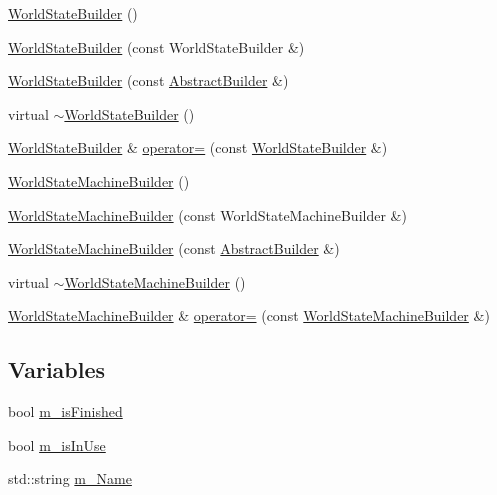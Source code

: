 \begin{DoxyCompactItemize}
\item 
\hyperlink{namespacejli_a88da1051609daf8c3b51a17aaaba6b20}{World\+State\+Builder} ()
\item 
\hyperlink{namespacejli_aafac5abdb6771d571a01cd2b15cf3c40}{World\+State\+Builder} (const World\+State\+Builder \&)
\item 
\hyperlink{namespacejli_a2fc992455822a29ef638f909b9c6d488}{World\+State\+Builder} (const \hyperlink{classjli_1_1_abstract_builder}{Abstract\+Builder} \&)
\item 
virtual \hyperlink{namespacejli_a1fd032a77e855549e124959bff91c7a1}{$\sim$\+World\+State\+Builder} ()
\item 
\hyperlink{namespacejli_a88da1051609daf8c3b51a17aaaba6b20}{World\+State\+Builder} \& \hyperlink{namespacejli_a3c6e238035eb39ac53eba6c12917498a}{operator=} (const \hyperlink{namespacejli_a88da1051609daf8c3b51a17aaaba6b20}{World\+State\+Builder} \&)
\item 
\hyperlink{namespacejli_a49d67a18946a3915d0a562ddf86b89c6}{World\+State\+Machine\+Builder} ()
\item 
\hyperlink{namespacejli_a6a39446edb896c185f35783291ea1149}{World\+State\+Machine\+Builder} (const World\+State\+Machine\+Builder \&)
\item 
\hyperlink{namespacejli_af7dfdedea09f0f90868c8bb003c929f0}{World\+State\+Machine\+Builder} (const \hyperlink{classjli_1_1_abstract_builder}{Abstract\+Builder} \&)
\item 
virtual \hyperlink{namespacejli_a9771b042fe85f154082f80b466292989}{$\sim$\+World\+State\+Machine\+Builder} ()
\item 
\hyperlink{namespacejli_a49d67a18946a3915d0a562ddf86b89c6}{World\+State\+Machine\+Builder} \& \hyperlink{namespacejli_ae3e2c8d1c5fbc155d7193d73db125543}{operator=} (const \hyperlink{namespacejli_a49d67a18946a3915d0a562ddf86b89c6}{World\+State\+Machine\+Builder} \&)
\end{DoxyCompactItemize}
\subsection*{Variables}
\begin{DoxyCompactItemize}
\item 
bool \hyperlink{namespacejli_a7e38adefffab3bce7cc5e105213c0989}{m\+\_\+is\+Finished}
\item 
bool \hyperlink{namespacejli_a3d9eb1afcfa6575a74fcbea812335204}{m\+\_\+is\+In\+Use}
\item 
std\+::string \hyperlink{namespacejli_ac62cb8257e356631f79c562e07188a0c}{m\+\_\+\+Name}
\end{DoxyCompactItemize}



